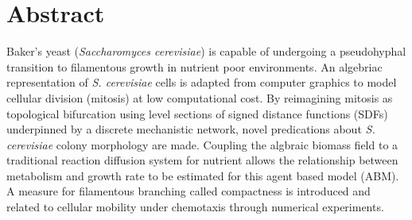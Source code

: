 \chapter{Abstract}
Baker's yeast (\textit{Saccharomyces cerevisiae}) is capable 
of undergoing a pseudohyphal transition to filamentous growth in nutrient poor environments.
An algebriac representation of \textit{S. cerevisiae} cells is adapted from
computer graphics to model cellular division (mitosis) at low computational cost.
By reimagining mitosis as topological bifurcation using level sections 
of signed distance functions (SDFs) underpinned by a discrete mechanistic network, 
novel predications about 
\textit{S. cerevisiae} colony morphology are made. Coupling 
the algbraic biomass field to a traditional reaction diffusion system 
for nutrient allows the relationship between metabolism 
and growth rate to be estimated for this agent based 
model (ABM). A measure for filamentous branching called compactness 
is introduced and related to cellular mobility under chemotaxis through
numerical experiments.  
